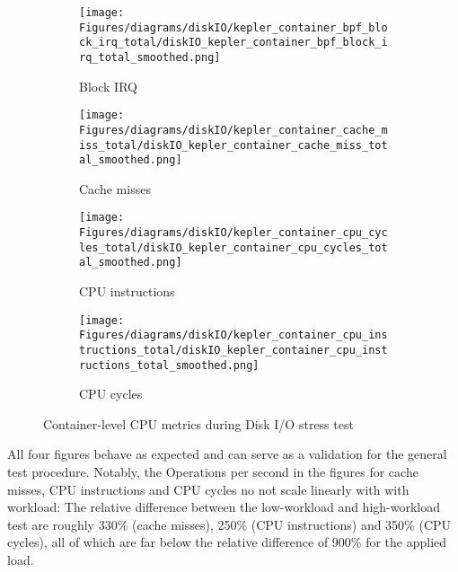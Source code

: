 \begin{figure}[H]
    \centering
    \begin{subfigure}{0.49\textwidth}
        \texttt{[image: Figures/diagrams/diskIO/kepler\_container\_bpf\_block\_irq\_total/diskIO\_kepler\_container\_bpf\_block\_irq\_total\_smoothed.png]}
        \caption{Block IRQ}
        \label{fig:cpu_kepler_container_cache_miss_total}
    \end{subfigure}
    \begin{subfigure}{0.49\textwidth}
        \texttt{[image: Figures/diagrams/diskIO/kepler\_container\_cache\_miss\_total/diskIO\_kepler\_container\_cache\_miss\_total\_smoothed.png]}
        \caption{Cache misses}
        \label{fig:diskIO_kepler_container_cache_miss_total}
    \end{subfigure}
    \begin{subfigure}{0.49\textwidth}
        \texttt{[image: Figures/diagrams/diskIO/kepler\_container\_cpu\_cycles\_total/diskIO\_kepler\_container\_cpu\_cycles\_total\_smoothed.png]}
        \caption{CPU instructions}
        \label{fig:diskIO_kepler_container_cpu_cycles_total}
    \end{subfigure}
    \begin{subfigure}{0.49\textwidth}
        \texttt{[image: Figures/diagrams/diskIO/kepler\_container\_cpu\_instructions\_total/diskIO\_kepler\_container\_cpu\_instructions\_total\_smoothed.png]}
        \caption{CPU cycles}
        \label{fig:diskIO_kepler_container_cpu_instructions_total}
    \end{subfigure}
    \caption{Container-level CPU metrics during Disk I/O stress test}
\end{figure}

All four figures behave as expected and can serve as a validation for the general test procedure.
Notably, the Operations per second in the figures for cache misses, CPU instructions and CPU cycles no not scale linearly with with workload: The relative difference between the low-workload and high-workload test are roughly 330\% (cache misses), 250\% (CPU instructions) and 350\% (CPU cycles), all of which are far below the relative difference of 900\% for the applied load. 

